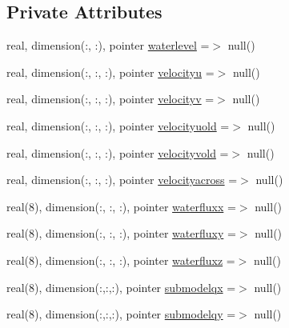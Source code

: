 \subsection*{Private Attributes}
\begin{DoxyCompactItemize}
\item 
real, dimension(\+:, \+:), pointer \mbox{\hyperlink{structmodulesequentialassimilation_1_1t__fullstate_a0fc77c2a8751df411c32dc41af5ca7a3}{waterlevel}} =$>$ null()
\item 
real, dimension(\+:, \+:, \+:), pointer \mbox{\hyperlink{structmodulesequentialassimilation_1_1t__fullstate_a1c9e096c6a025371e88d2849c90b28a1}{velocityu}} =$>$ null()
\item 
real, dimension(\+:, \+:, \+:), pointer \mbox{\hyperlink{structmodulesequentialassimilation_1_1t__fullstate_a2904d68fa5048ca942f0bec7e98089d1}{velocityv}} =$>$ null()
\item 
real, dimension(\+:, \+:, \+:), pointer \mbox{\hyperlink{structmodulesequentialassimilation_1_1t__fullstate_ac99b7fcff0771909804c797599bf5983}{velocityuold}} =$>$ null()
\item 
real, dimension(\+:, \+:, \+:), pointer \mbox{\hyperlink{structmodulesequentialassimilation_1_1t__fullstate_a070a50c90add12f05ca5182e7add9aaa}{velocityvold}} =$>$ null()
\item 
real, dimension(\+:, \+:, \+:), pointer \mbox{\hyperlink{structmodulesequentialassimilation_1_1t__fullstate_ad0d0c27bebd77b8f473c9cd62970e81a}{velocityacross}} =$>$ null()
\item 
real(8), dimension(\+:, \+:, \+:), pointer \mbox{\hyperlink{structmodulesequentialassimilation_1_1t__fullstate_ae3f6c8e02c7c086dedc5cf09a8206d83}{waterfluxx}} =$>$ null()
\item 
real(8), dimension(\+:, \+:, \+:), pointer \mbox{\hyperlink{structmodulesequentialassimilation_1_1t__fullstate_aa2a5184f3a8ea4560d0d748cbbb8b132}{waterfluxy}} =$>$ null()
\item 
real(8), dimension(\+:, \+:, \+:), pointer \mbox{\hyperlink{structmodulesequentialassimilation_1_1t__fullstate_aa5cda2afad64d64962ddc0e8bd30a4bb}{waterfluxz}} =$>$ null()
\item 
real(8), dimension(\+:,\+:,\+:), pointer \mbox{\hyperlink{structmodulesequentialassimilation_1_1t__fullstate_a4cafbe1abfd478719057e75d6692e713}{submodelqx}} =$>$ null()
\item 
real(8), dimension(\+:,\+:,\+:), pointer \mbox{\hyperlink{structmodulesequentialassimilation_1_1t__fullstate_a48a8d32d2b72dae40c8921f1d6b3aca3}{submodelqy}} =$>$ null()

\end{DoxyCompactItemize}
